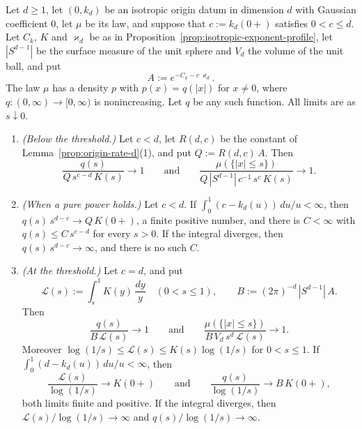 \begin{proposition}\label{prop:origin-rate-profile-d}
Let $d \ge 1$, let $(0, k_d)$ be an isotropic origin datum in dimension $d$ with Gaussian
coefficient $0$, let $\mu$ be its law, and suppose that $c := k_d(0{+})$ satisfies $0 < c \le d$.
Let $C_k$, $K$ and $\varkappa_d$ be as in Proposition~\ref{prop:isotropic-exponent-profile}, let $|S^{d-1}|$
be the surface measure of the unit sphere and $V_d$ the volume of the unit ball, and put
\[
  A := e^{-C_k - c\,\varkappa_d} .
\]
The law $\mu$ has a density $p$ with $p(x) = q(|x|)$ for $x \ne 0$, where
$q : (0,\infty) \to [0,\infty)$ is nonincreasing. Let $q$ be any such function. All limits are as
$s \downarrow 0$.
\begin{enumerate}
\item \emph{(Below the threshold.)} Let $c < d$, let $R(d,c)$ be the constant of
Lemma~\ref{prop:origin-rate-d}(1), and put $Q := R(d,c)\,A$. Then
\[
  \frac{q(s)}{Q\,s^{c-d}\,K(s)} \to 1
  \qquad\text{and}\qquad
  \frac{\mu(\{|x| \le s\})}{Q\,|S^{d-1}|\,c^{-1}\,s^{c}\,K(s)} \to 1 .
\]
\item \emph{(When a pure power holds.)} Let $c < d$. If
$\int_0^1 (c - k_d(u))\,du/u < \infty$, then $q(s)\,s^{d-c} \to Q\,K(0{+})$, a finite positive
number, and there is $C < \infty$ with $q(s) \le C\,s^{c-d}$ for every $s > 0$. If the integral
diverges, then $q(s)\,s^{d-c} \to \infty$, and there is no such $C$.
\item \emph{(At the threshold.)} Let $c = d$, and put
\[
  \mathcal{L}(s) := \int_s^1 K(y)\,\frac{dy}{y} \quad (0 < s \le 1), \qquad
  B := (2\pi)^{-d}\,|S^{d-1}|\,A .
\]
Then
\[
  \frac{q(s)}{B\,\mathcal{L}(s)} \to 1
  \qquad\text{and}\qquad
  \frac{\mu(\{|x| \le s\})}{B\,V_d\,s^{d}\,\mathcal{L}(s)} \to 1 .
\]
Moreover $\log(1/s) \le \mathcal{L}(s) \le K(s)\log(1/s)$ for $0 < s \le 1$. If
$\int_0^1 (d - k_d(u))\,du/u < \infty$, then
\[
  \frac{\mathcal{L}(s)}{\log(1/s)} \to K(0{+})
  \qquad\text{and}\qquad
  \frac{q(s)}{\log(1/s)} \to B\,K(0{+}) ,
\]
both limits finite and positive. If the integral diverges, then
$\mathcal{L}(s)/\log(1/s) \to \infty$ and $q(s)/\log(1/s) \to \infty$.
\end{enumerate}
\end{proposition}

